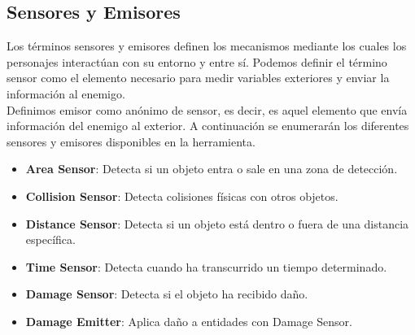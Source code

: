 \subsection{Sensores y Emisores}
\label{subsec:sensores y emisores}
Los términos sensores y emisores definen los mecanismos mediante los cuales los personajes interactúan con su entorno y entre sí.
Podemos definir el término sensor como el elemento necesario para medir variables exteriores y enviar la información al enemigo.\\
Definimos emisor como anónimo de sensor, es decir, es aquel elemento que envía información del enemigo al exterior.
A continuación se enumerarán los diferentes sensores y emisores disponibles en la herramienta.
\begin{itemize}
    \item \textbf{Area Sensor}: Detecta si un objeto entra o sale en una zona de detección.
    \item \textbf{Collision Sensor}: Detecta colisiones físicas con otros objetos.
    \item \textbf{Distance Sensor}: Detecta si un objeto está dentro o fuera de una distancia específica.
    \item \textbf{Time Sensor}: Detecta cuando ha transcurrido un tiempo determinado.
    \item \textbf{Damage Sensor}: Detecta si el objeto ha recibido daño.
    \item \textbf{Damage Emitter}: Aplica daño a entidades con Damage Sensor.
\end{itemize}
